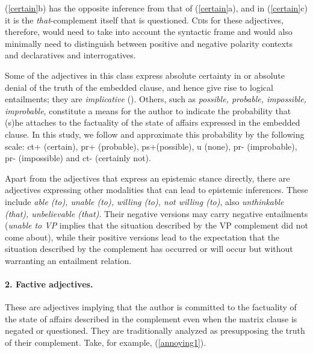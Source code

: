 \documentclass[10pt]{article}
\begin{document}
\vspace{-0.6em}
 \vspace{-0.6em} 
(\ref{certain}b) has the opposite inference from that of
 (\ref{certain}a), and 
in (\ref{certain}c) it is the
 \textit{that}-complement itself that is questioned. 
C\textsc{di}s for these adjectives, therefore, would need to take into account the syntactic frame and would also minimally need to distinguish between positive and negative polarity contexts and declaratives and interrogatives.

Some of the adjectives in this class express absolute certainty in or absolute denial of the truth of the embedded clause, and hence give rise to logical entailments; they are \textit{implicative} (\cite{karttunen:1971}). Others, such as \textit{possible, probable, impossible, improbable}, 
constitute a means for the author  to indicate the probability that (s)he attaches to the factuality of the state of affairs expressed in the embedded clause. In this study, we follow \cite{sauri:2008phd} and approximate this probability by the following scale: {\sc ct}+ (certain), {\sc pr}+ (probable), {\sc ps}+(possible), {\sc u} (none), {\sc pr}- (improbable), {\sc pr}- (impossible) and {\sc ct}- (certainly not).

Apart from the adjectives that express an epistemic stance directly, there are adjectives expressing other modalities that can lead to epistemic inferences. These include \textit{able (to), unable (to), willing (to), not willing (to)}, also \textit{unthinkable (that), unbelievable (that)}. Their negative versions may carry negative entailments (\textit{unable to VP} implies that the situation 
described  by the VP complement did not come about), while their positive versions lead to the expectation that the situation described by the complement has occurred or will occur but without warranting an entailment relation.
\vspace{-.2in}
\paragraph{2. Factive adjectives.} These are adjectives  implying that the author is committed to the factuality of the state of affairs described in the complement even when the matrix clause is negated or questioned. They are traditionally analyzed as presupposing the truth of their complement.
Take, for example, (\ref{annoying1}).
 
\end{document}
